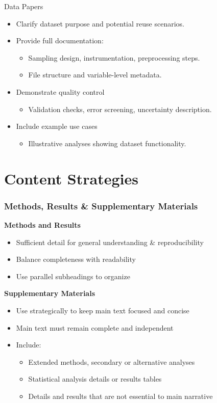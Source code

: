 \documentclass{beamer}
\begin{document}
\begin{frame}{Data Papers}
\begin{itemize}
    \item Clarify dataset purpose and potential reuse scenarios.
    \item Provide full documentation:
    \begin{itemize}
        \item Sampling design, instrumentation, preprocessing steps.
        \item File structure and variable-level metadata.
    \end{itemize}
    \item Demonstrate quality control
    \begin{itemize}
        \item Validation checks, error screening, uncertainty description.
    \end{itemize}
    \item Include example use cases
    \begin{itemize}
        \item Illustrative analyses showing dataset functionality.
    \end{itemize}
\end{itemize}

\end{frame}


\section{Content Strategies}

\begin{frame}
  \frametitle{Methods, Results \& Supplementary Materials}
  \textbf{Methods and Results}
  \begin{itemize}
    \item Sufficient detail for general understanding \& reproducibility
    \item Balance completeness with readability
    \item Use parallel subheadings to organize
  \end{itemize}

  \textbf{Supplementary Materials}
  \begin{itemize}
    \item Use strategically to keep main text focused and concise
    \item Main text must remain complete and independent
    \item Include:
    \begin{itemize}
      \item Extended methods, secondary or alternative analyses
      \item Statistical analysis details or results tables
      \item Details and results that are not essential to main narrative
    \end{itemize}
  \end{itemize}
\end{frame}
\end{document}
